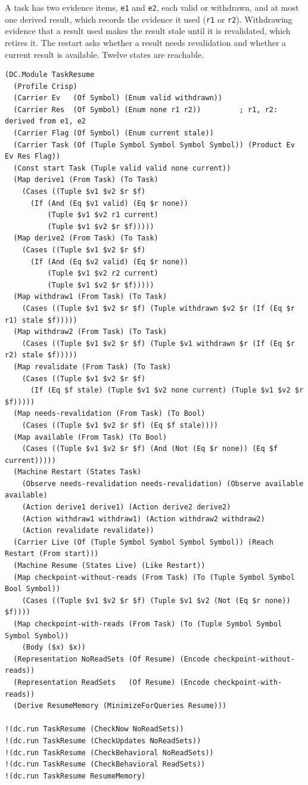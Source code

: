 \documentclass[11pt]{article}
\newcommand{\code}[1]{\texttt{#1}}
\theoremstyle{definition}
\theoremstyle{plain}
\begin{document}
A task has two evidence items, \code{e1} and \code{e2}, each valid or withdrawn, and at most one
derived result, which records the evidence it used (\code{r1} or \code{r2}). Withdrawing evidence
that a result used makes the result stale until it is revalidated, which retires it. The restart
asks whether a result needs revalidation and whether a current result is available. Twelve states
are reachable.
\begin{lstlisting}[style=mettamod]
(DC.Module TaskResume
  (Profile Crisp)
  (Carrier Ev   (Of Symbol) (Enum valid withdrawn))
  (Carrier Res  (Of Symbol) (Enum none r1 r2))         ; r1, r2: derived from e1, e2
  (Carrier Flag (Of Symbol) (Enum current stale))
  (Carrier Task (Of (Tuple Symbol Symbol Symbol Symbol)) (Product Ev Ev Res Flag))
  (Const start Task (Tuple valid valid none current))
  (Map derive1 (From Task) (To Task)
    (Cases ((Tuple $v1 $v2 $r $f)
      (If (And (Eq $v1 valid) (Eq $r none))
          (Tuple $v1 $v2 r1 current)
          (Tuple $v1 $v2 $r $f)))))
  (Map derive2 (From Task) (To Task)
    (Cases ((Tuple $v1 $v2 $r $f)
      (If (And (Eq $v2 valid) (Eq $r none))
          (Tuple $v1 $v2 r2 current)
          (Tuple $v1 $v2 $r $f)))))
  (Map withdraw1 (From Task) (To Task)
    (Cases ((Tuple $v1 $v2 $r $f) (Tuple withdrawn $v2 $r (If (Eq $r r1) stale $f)))))
  (Map withdraw2 (From Task) (To Task)
    (Cases ((Tuple $v1 $v2 $r $f) (Tuple $v1 withdrawn $r (If (Eq $r r2) stale $f)))))
  (Map revalidate (From Task) (To Task)
    (Cases ((Tuple $v1 $v2 $r $f)
      (If (Eq $f stale) (Tuple $v1 $v2 none current) (Tuple $v1 $v2 $r $f)))))
  (Map needs-revalidation (From Task) (To Bool)
    (Cases ((Tuple $v1 $v2 $r $f) (Eq $f stale))))
  (Map available (From Task) (To Bool)
    (Cases ((Tuple $v1 $v2 $r $f) (And (Not (Eq $r none)) (Eq $f current)))))
  (Machine Restart (States Task)
    (Observe needs-revalidation needs-revalidation) (Observe available available)
    (Action derive1 derive1) (Action derive2 derive2)
    (Action withdraw1 withdraw1) (Action withdraw2 withdraw2)
    (Action revalidate revalidate))
  (Carrier Live (Of (Tuple Symbol Symbol Symbol Symbol)) (Reach Restart (From start)))
  (Machine Resume (States Live) (Like Restart))
  (Map checkpoint-without-reads (From Task) (To (Tuple Symbol Symbol Bool Symbol))
    (Cases ((Tuple $v1 $v2 $r $f) (Tuple $v1 $v2 (Not (Eq $r none)) $f))))
  (Map checkpoint-with-reads (From Task) (To (Tuple Symbol Symbol Symbol Symbol))
    (Body ($x) $x))
  (Representation NoReadSets (Of Resume) (Encode checkpoint-without-reads))
  (Representation ReadSets   (Of Resume) (Encode checkpoint-with-reads))
  (Derive ResumeMemory (MinimizeForQueries Resume)))

!(dc.run TaskResume (CheckNow NoReadSets))
!(dc.run TaskResume (CheckUpdates NoReadSets))
!(dc.run TaskResume (CheckBehavioral NoReadSets))
!(dc.run TaskResume (CheckBehavioral ReadSets))
!(dc.run TaskResume ResumeMemory)
\end{lstlisting}
\end{document}
